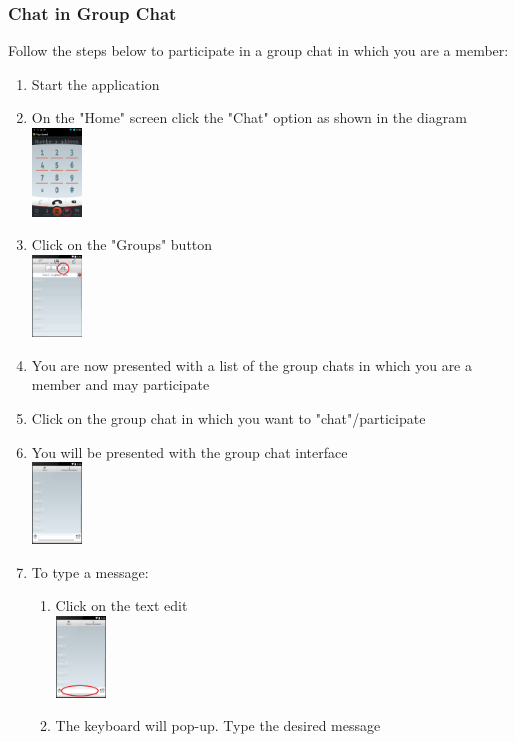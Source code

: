 \documentclass[11pt]{article}
\begin{document}
\subsubsection*{Chat in Group Chat}
Follow the steps below to participate in a group chat in which you are a member:
\begin{enumerate}
\item Start the application
\item On the "Home" screen click the "Chat" option as shown in the diagram\\
\includegraphics[width=50px]{images/mainScreen.png}
\item Click on the "Groups" button\\
\includegraphics[width=50px]{images/ChatlistNav.png}
\item You are now presented with a list of the group chats in which you are a member and may participate
\item Click on the group chat in which you want to "chat"/participate
\item You will be presented with the group chat interface\\
\includegraphics[width=50px]{images/groupchat.png}
\item To type a message:
\begin{enumerate}
\item Click on the text edit\\
\includegraphics[width=50px]{images/groupchatEdit.png}
\item The keyboard will pop-up. Type the desired message

\end{enumerate}
\end{enumerate}
\end{document}
